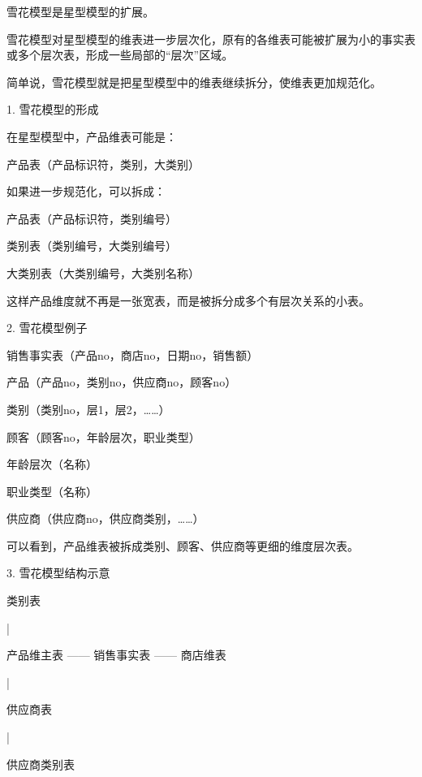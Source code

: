 \documentclass[UTF8,zihao=-4]{ctexart}
\begin{document}
雪花模型是星型模型的扩展。\par

雪花模型对星型模型的维表进一步层次化，原有的各维表可能被扩展为小的事实表或多个层次表，形成一些局部的“层次”区域。\par

简单说，雪花模型就是把星型模型中的维表继续拆分，使维表更加规范化。\par

1. 雪花模型的形成\par

在星型模型中，产品维表可能是：\par

产品表（产品标识符，类别，大类别）\par

如果进一步规范化，可以拆成：\par

产品表（产品标识符，类别编号）\par
类别表（类别编号，大类别编号）\par
大类别表（大类别编号，大类别名称）\par

这样产品维度就不再是一张宽表，而是被拆分成多个有层次关系的小表。\par

2. 雪花模型例子\par

销售事实表（产品no，商店no，日期no，销售额）\par

产品（产品no，类别no，供应商no，顾客no）\par
类别（类别no，层1，层2，……）\par
顾客（顾客no，年龄层次，职业类型）\par
年龄层次（名称）\par
职业类型（名称）\par
供应商（供应商no，供应商类别，……）\par

可以看到，产品维表被拆成类别、顾客、供应商等更细的维度层次表。\par

3. 雪花模型结构示意\par
\hspace*{1em}类别表\par
\hspace*{1em}|\par
产品维主表 —— 销售事实表 —— 商店维表\par
\hspace*{1em}|\par
\hspace*{1em}供应商表\par
\hspace*{1em}|\par
\hspace*{1em}供应商类别表\par
\end{document}
